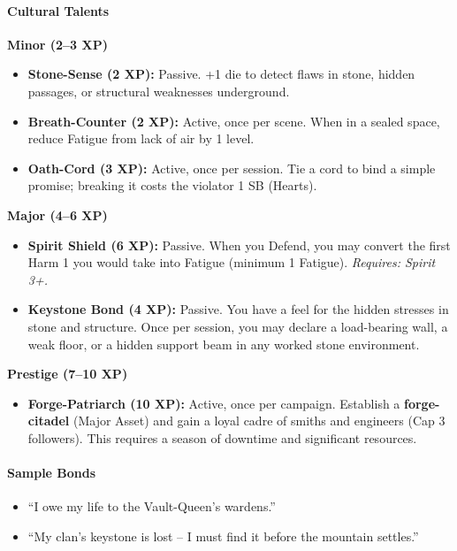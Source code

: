 \paragraph{Cultural Talents}

\textbf{Minor (2--3 XP)}
\begin{itemize}
  \item \textbf{Stone-Sense (2 XP):} Passive. +1 die to detect flaws in stone, hidden passages, or structural weaknesses underground.
  \item \textbf{Breath-Counter (2 XP):} Active, once per scene. When in a sealed space, reduce Fatigue from lack of air by 1 level.
  \item \textbf{Oath-Cord (3 XP):} Active, once per session. Tie a cord to bind a simple promise; breaking it costs the violator 1 SB (Hearts).
\end{itemize}

\textbf{Major (4--6 XP)}
\begin{itemize}
  \item \textbf{Spirit Shield (6 XP):} Passive. When you Defend, you may convert the first Harm 1 you would take into Fatigue (minimum 1 Fatigue). \textit{Requires: Spirit 3+.}
  \item \textbf{Keystone Bond (4 XP):} Passive. You have a feel for the hidden stresses in stone and structure. Once per session, you may declare a load-bearing wall, a weak floor, or a hidden support beam in any worked stone environment.
\end{itemize}

\textbf{Prestige (7--10 XP)}
\begin{itemize}
  \item \textbf{Forge-Patriarch (10 XP):} Active, once per campaign. Establish a \textbf{forge-citadel} (Major Asset) and gain a loyal cadre of smiths and engineers (Cap 3 followers). This requires a season of downtime and significant resources.
\end{itemize}

\paragraph{Sample Bonds}
\begin{itemize}
  \item ``I owe my life to the Vault-Queen's wardens.''
  \item ``My clan's keystone is lost -- I must find it before the mountain settles.''
\end{itemize}


